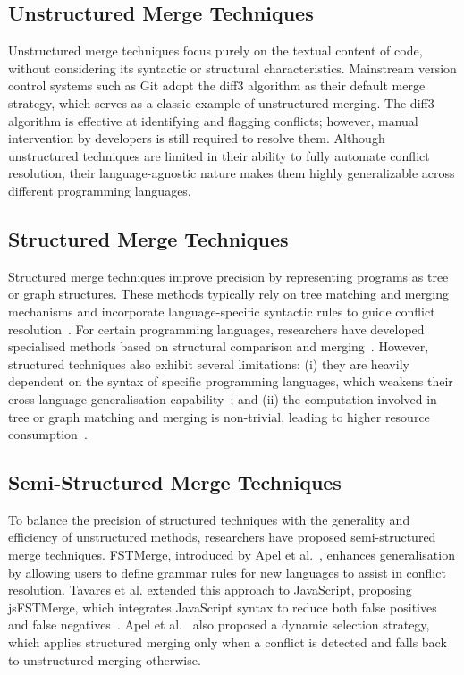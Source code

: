 \documentclass[sigconf,review,anonymous]{acmart}
\begin{document}
\subsection{Unstructured Merge Techniques}
Unstructured merge techniques focus purely on the textual content of code, without considering its syntactic or structural characteristics. Mainstream version control systems such as Git adopt the diff3 algorithm as their default merge strategy, which serves as a classic example of unstructured merging. The diff3 algorithm is effective at identifying and flagging conflicts; however, manual intervention by developers is still required to resolve them. Although unstructured techniques are limited in their ability to fully automate conflict resolution, their language-agnostic nature makes them highly generalizable across different programming languages.

\subsection{Structured Merge Techniques}
Structured merge techniques improve precision by representing programs as tree or graph structures. These methods typically rely on tree matching and merging mechanisms and incorporate language-specific syntactic rules to guide conflict resolution~\cite{r1, 11}. For certain programming languages, researchers have developed specialised methods based on structural comparison and merging~\cite{r3}. However, structured techniques also exhibit several limitations: (i) they are heavily dependent on the syntax of specific programming languages, which weakens their cross-language generalisation capability~\cite{r4}; and (ii) the computation involved in tree or graph matching and merging is non-trivial, leading to higher resource consumption~\cite{r5}.

\subsection{Semi-Structured Merge Techniques}
To balance the precision of structured techniques with the generality and efficiency of unstructured methods, researchers have proposed semi-structured merge techniques. FSTMerge, introduced by Apel et al.~\cite{r1}, enhances generalisation by allowing users to define grammar rules for new languages to assist in conflict resolution. Tavares et al. extended this approach to JavaScript, proposing jsFSTMerge, which integrates JavaScript syntax to reduce both false positives and false negatives~\cite{10}. Apel et al.~\cite{11} also proposed a dynamic selection strategy, which applies structured merging only when a conflict is detected and falls back to unstructured merging otherwise.
\end{document}
